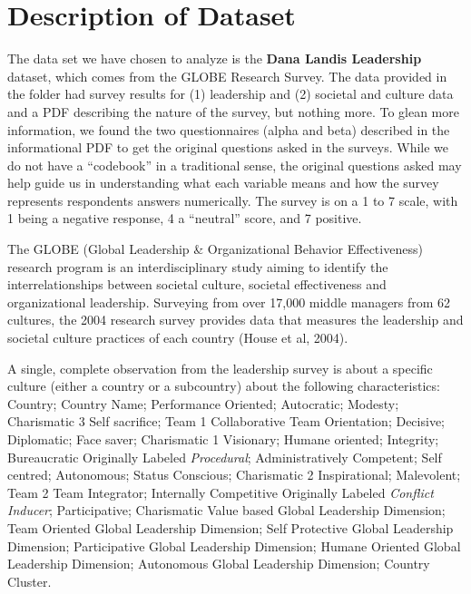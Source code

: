 \documentclass[
]{article}
\begin{document}
\hypertarget{description-of-dataset}{%
\section{Description of Dataset}\label{description-of-dataset}}

The data set we have chosen to analyze is the \textbf{Dana Landis
Leadership} dataset, which comes from the GLOBE Research Survey. The
data provided in the folder had survey results for (1) leadership and
(2) societal and culture data and a PDF describing the nature of the
survey, but nothing more. To glean more information, we found the two
questionnaires (alpha and beta) described in the informational PDF to
get the original questions asked in the surveys. While we do not have a
``codebook'' in a traditional sense, the original questions asked may
help guide us in understanding what each variable means and how the
survey represents respondents answers numerically. The survey is on a 1
to 7 scale, with 1 being a negative response, 4 a ``neutral'' score, and
7 positive.

The GLOBE (Global Leadership \& Organizational Behavior Effectiveness)
research program is an interdisciplinary study aiming to identify the
interrelationships between societal culture, societal effectiveness and
organizational leadership. Surveying from over 17,000 middle managers
from 62 cultures, the 2004 research survey provides data that measures
the leadership and societal culture practices of each country (House et
al, 2004).

A single, complete observation from the leadership survey is about a
specific culture (either a country or a subcountry) about the following
characteristics: Country; Country Name; Performance Oriented;
Autocratic; Modesty; Charismatic 3 Self sacrifice; Team 1 Collaborative
Team Orientation; Decisive; Diplomatic; Face saver; Charismatic 1
Visionary; Humane oriented; Integrity; Bureaucratic Originally Labeled
\emph{Procedural}; Administratively Competent; Self centred; Autonomous;
Status Conscious; Charismatic 2 Inspirational; Malevolent; Team 2 Team
Integrator; Internally Competitive Originally Labeled \emph{Conflict
Inducer}; Participative; Charismatic Value based Global Leadership
Dimension; Team Oriented Global Leadership Dimension; Self Protective
Global Leadership Dimension; Participative Global Leadership Dimension;
Humane Oriented Global Leadership Dimension; Autonomous Global
Leadership Dimension; Country Cluster.
\end{document}
